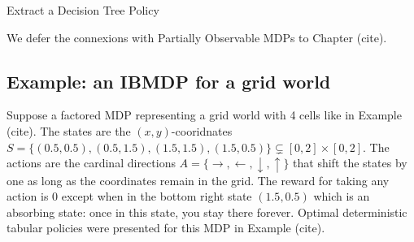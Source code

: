 \begin{algorithm}[t]
    
    
    
    \caption{Extract a Decision Tree Policy}\label{alg_extract_tree}
\end{algorithm}

We defer the connexions with Partially Observable MDPs to Chapter (cite).

\subsection{Example: an IBMDP for a grid world}
Suppose a factored MDP representing a grid world with 4 cells like in Example (cite). 
The states are the $(x,y)$-cooridnates $S = \{(0.5, 0.5), (0.5, 1.5), (1.5, 1.5), (1.5, 0.5)\}\subsetneq [0, 2] \times [0, 2]$.
The actions are the cardinal directions $A = \{\rightarrow, \leftarrow, \downarrow, \uparrow\}$ that shift the states by one as long as the coordinates remain in the grid.
The reward for taking any action is 0 except when in the bottom right state $(1.5, 0.5)$ which is an absorbing state: once in this state, you stay there forever. 
Optimal deterministic tabular policies were presented for this MDP in Example (cite).

